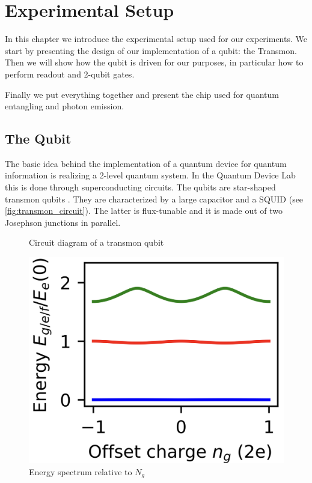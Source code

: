 \documentclass[12pt,a4paper]{report}
\begin{document}





\begingroup
    \hypersetup{linkcolor=black}
    \renewcommand\contentsname{\bfseries Contents}
    \tableofcontents
\endgroup



\chapter{Experimental Setup}
\label{Chap:experimental}

In this chapter we introduce the experimental setup used for our experiments.
We start by presenting the design of our implementation of a qubit: the Transmon.
Then we will show how the qubit is driven for our purposes, in particular how to perform readout and 2-qubit gates.

Finally we put everything together and present the chip used for quantum entangling and photon emission.

\section{The Qubit}
\label{sec:qubit}

The basic idea behind the implementation of a quantum device for quantum information is realizing a 2-level quantum system.
In the Quantum Device Lab this is done through superconducting circuits.
The qubits are star-shaped transmon qubits \cite{transmon_qubits}.
They are characterized by a large capacitor and a SQUID (see \cref{fig:transmon_circuit}).
The latter is flux-tunable and it is made out of two Josephson junctions in parallel.
\begin{figure}[htbp]
    \begin{minipage}[b]{0.5\linewidth}
      \centering
      
      \captionsetup{skip=-20pt}
      \caption{Circuit diagram of a transmon qubit}
      \label{fig:transmon_circuit}
    \end{minipage}
    \hfill
    \begin{minipage}[b]{0.45\linewidth}
      \centering
      \includegraphics[width = 0.5 \textwidth]{Images/Chap1/Qubit_energy.png}
      \caption{Energy spectrum relative to $N_g$}
      \label{fig:qubit_energy}
    \end{minipage}
  \end{figure}
  
\end{document}
